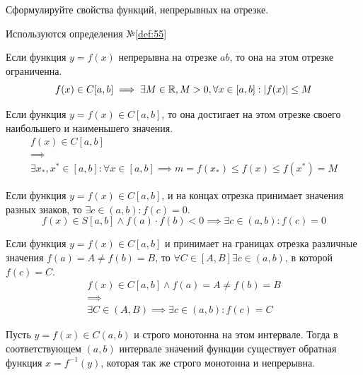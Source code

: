 \begin{question}
    Сформулируйте свойства функций, непрерывных на отрезке.
\end{question}
\begin{used}
    Используются определения №\ref{def:55}
\end{used}
\begin{theorem}
    Если функция $y = f(x)$ непрерывна на отрезке $ab$, то она на этом отрезке ограниченна. \[
        f(x) \in C[a, b] \implies \exists M \in \mathbb{R}, M > 0, \forall x \in [a, b] : |f(x)| \le  M
    \] 
\end{theorem}
\begin{theorem}
    Если функция $y = f(x) \in C[a, b]$, то она достигает на этом отрезке своего наибольшего и наименьшего значения.
    \begin{gather*}
        f(x) \in C[a, b] \\
        \implies \\
        \exists x_*, x^* \in [a, b] : \forall x \in [a, b] \implies m = f(x_*) \le f(x) \le f(x^*) = M
    \end{gather*}
\end{theorem}
\begin{theorem}
    Если функция $y = f(x) \in C[a, b]$, и на концах отрезка принимает значения разных знаков, то $\exists c \in (a, b) : f(c) = 0$. \[
        f(x) \in S[a, b] \land f(a) \cdot f(b) < 0 \implies \exists  c \in (a, b) : f(c) = 0
    \] 
\end{theorem}
\begin{theorem}
    Если функция $y = f(x) \in C[a, b]$ и принимает на границах отрезка различные значения $f(a) = A \neq f(b) = B$, то $\forall C \in [A, B] \exists c \in (a, b)$, в которой $f(c) = C$.
    \begin{gather*}
        f(x) \in C[a, b] \land f(a) = A \neq f(b) = B \\
        \implies \\
        \exists C \in (A, B) \implies \exists c \in (a, b) : f(c) = C
    \end{gather*}
\end{theorem}
\begin{theorem}
    Пусть $y = f(x) \in C(a, b)$ и строго монотонна на этом интервале. Тогда в соответствующем $(a, b)$ интервале значений функции существует обратная функция $x = f^{-1}(y)$, которая так же строго монотонна и непрерывна.
\end{theorem}
\pagebreak


